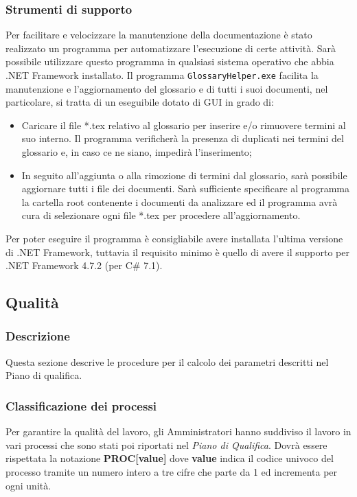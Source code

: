 \subsubsection{Strumenti di supporto}
Per facilitare e velocizzare la manutenzione della documentazione è stato realizzato un programma per automatizzare l’esecuzione di certe attività. Sarà possibile utilizzare questo programma in qualsiasi sistema operativo che abbia .NET Framework installato. Il programma \texttt{GlossaryHelper.exe} facilita la manutenzione e l’aggiornamento del glossario e di tutti i suoi documenti, nel particolare, si tratta di un eseguibile dotato di GUI in grado di:
\begin{itemize}
    \item Caricare il file *.tex relativo al glossario per inserire e/o rimuovere termini al suo interno. Il programma verificherà la presenza di duplicati nei termini del glossario e, in caso ce ne siano, impedirà l’inserimento;
    \item In seguito all’aggiunta o alla rimozione di termini dal glossario, sarà possibile aggiornare tutti i file dei documenti. Sarà sufficiente specificare al programma la cartella root contenente i documenti da analizzare ed il programma avrà cura di selezionare ogni file *.tex per procedere all’aggiornamento.
\end{itemize}
Per poter eseguire il programma è consigliabile avere installata l’ultima versione di .NET Framework, tuttavia il requisito minimo è quello di avere il supporto per .NET Framework 4.7.2 (per C\# 7.1).
\subsection{Qualità}
\label{sec:qualita}
\subsubsection{Descrizione}
Questa sezione descrive le procedure per il calcolo dei parametri descritti nel Piano di qualifica.
\subsubsection{Classificazione dei processi}
Per garantire la qualità del lavoro, gli Amministratori hanno suddiviso il lavoro in vari processi che sono stati poi riportati nel \emph{Piano di Qualifica}. Dovrà essere rispettata la notazione \textbf{PROC[value]}  dove \textbf{value} indica il codice univoco del processo tramite un numero intero a tre cifre che parte da 1 ed incrementa per ogni unità.
